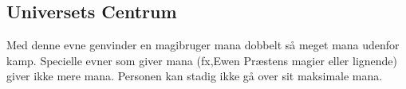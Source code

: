 \subsection{Universets Centrum}
Med denne evne genvinder en magibruger mana dobbelt så meget mana udenfor kamp. Specielle evner som giver mana (fx,Ewen Præstens magier eller lignende) giver ikke mere mana. Personen kan stadig ikke gå over sit maksimale mana.